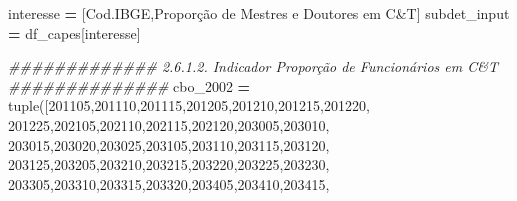 \documentclass[
  12,
  dvipsnames]{article}
\newenvironment{Shaded}{\begin{snugshade}}{\end{snugshade}}
\newcommand{\BuiltInTok}[1]{#1}
\newcommand{\CommentTok}[1]{\textcolor[rgb]{0.56,0.35,0.01}{\textit{#1}}}
\newcommand{\NormalTok}[1]{#1}
\newcommand{\OperatorTok}[1]{\textcolor[rgb]{0.81,0.36,0.00}{\textbf{#1}}}
\newcommand{\StringTok}[1]{\textcolor[rgb]{0.31,0.60,0.02}{#1}}
\begin{document}
\begin{Shaded}
\begin{Highlighting}[]
\NormalTok{interesse }\OperatorTok{=}\NormalTok{ [}\StringTok{\textquotesingle{}Cod.IBGE\textquotesingle{}}\NormalTok{,}\StringTok{\textquotesingle{}Proporção de Mestres e Doutores em C\&T\textquotesingle{}}\NormalTok{]}
\NormalTok{subdet\_input }\OperatorTok{=}\NormalTok{ df\_capes[interesse]}

\CommentTok{\#\#\#\#\#\#\#\#\#\#\#\#\# 2.6.1.2. Indicador Proporção de Funcionários em C\&T \#\#\#\#\#\#\#\#\#\#\#\#\#\#}
\NormalTok{cbo\_2002 }\OperatorTok{=} \BuiltInTok{tuple}\NormalTok{([}\StringTok{\textquotesingle{}201105\textquotesingle{}}\NormalTok{,}\StringTok{\textquotesingle{}201110\textquotesingle{}}\NormalTok{,}\StringTok{\textquotesingle{}201115\textquotesingle{}}\NormalTok{,}\StringTok{\textquotesingle{}201205\textquotesingle{}}\NormalTok{,}\StringTok{\textquotesingle{}201210\textquotesingle{}}\NormalTok{,}\StringTok{\textquotesingle{}201215\textquotesingle{}}\NormalTok{,}\StringTok{\textquotesingle{}201220\textquotesingle{}}\NormalTok{,}
                  \StringTok{\textquotesingle{}201225\textquotesingle{}}\NormalTok{,}\StringTok{\textquotesingle{}202105\textquotesingle{}}\NormalTok{,}\StringTok{\textquotesingle{}202110\textquotesingle{}}\NormalTok{,}\StringTok{\textquotesingle{}202115\textquotesingle{}}\NormalTok{,}\StringTok{\textquotesingle{}202120\textquotesingle{}}\NormalTok{,}\StringTok{\textquotesingle{}203005\textquotesingle{}}\NormalTok{,}\StringTok{\textquotesingle{}203010\textquotesingle{}}\NormalTok{,}
                  \StringTok{\textquotesingle{}203015\textquotesingle{}}\NormalTok{,}\StringTok{\textquotesingle{}203020\textquotesingle{}}\NormalTok{,}\StringTok{\textquotesingle{}203025\textquotesingle{}}\NormalTok{,}\StringTok{\textquotesingle{}203105\textquotesingle{}}\NormalTok{,}\StringTok{\textquotesingle{}203110\textquotesingle{}}\NormalTok{,}\StringTok{\textquotesingle{}203115\textquotesingle{}}\NormalTok{,}\StringTok{\textquotesingle{}203120\textquotesingle{}}\NormalTok{,}
                  \StringTok{\textquotesingle{}203125\textquotesingle{}}\NormalTok{,}\StringTok{\textquotesingle{}203205\textquotesingle{}}\NormalTok{,}\StringTok{\textquotesingle{}203210\textquotesingle{}}\NormalTok{,}\StringTok{\textquotesingle{}203215\textquotesingle{}}\NormalTok{,}\StringTok{\textquotesingle{}203220\textquotesingle{}}\NormalTok{,}\StringTok{\textquotesingle{}203225\textquotesingle{}}\NormalTok{,}\StringTok{\textquotesingle{}203230\textquotesingle{}}\NormalTok{,}
                  \StringTok{\textquotesingle{}203305\textquotesingle{}}\NormalTok{,}\StringTok{\textquotesingle{}203310\textquotesingle{}}\NormalTok{,}\StringTok{\textquotesingle{}203315\textquotesingle{}}\NormalTok{,}\StringTok{\textquotesingle{}203320\textquotesingle{}}\NormalTok{,}\StringTok{\textquotesingle{}203405\textquotesingle{}}\NormalTok{,}\StringTok{\textquotesingle{}203410\textquotesingle{}}\NormalTok{,}\StringTok{\textquotesingle{}203415\textquotesingle{}}\NormalTok{,}

\end{Highlighting}
\end{Shaded}
\end{document}
